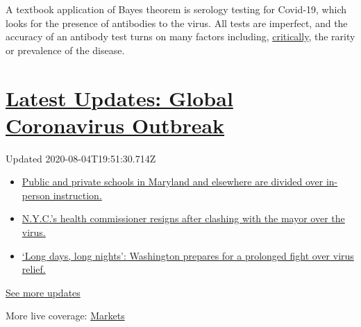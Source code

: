 A textbook application of Bayes theorem is serology testing for
Covid-19, which looks for the presence of antibodies to the virus. All
tests are imperfect, and the accuracy of an antibody test turns on many
factors including,
\href{https://www.scientificamerican.com/article/coronavirus-antibody-tests-have-a-mathematical-pitfall/}{critically},
the rarity or prevalence of the disease.

\hypertarget{latest-updates-global-coronavirus-outbreak}{%
\section{\texorpdfstring{\href{https://www.nytimes.com/2020/08/04/world/coronavirus-cases.html?action=click\&pgtype=Article\&state=default\&region=MAIN_CONTENT_1\&context=storylines_live_updates}{Latest
Updates: Global Coronavirus
Outbreak}}{Latest Updates: Global Coronavirus Outbreak}}\label{latest-updates-global-coronavirus-outbreak}}

Updated 2020-08-04T19:51:30.714Z

\begin{itemize}
\tightlist
\item
  \href{https://www.nytimes.com/2020/08/04/world/coronavirus-cases.html?action=click\&pgtype=Article\&state=default\&region=MAIN_CONTENT_1\&context=storylines_live_updates\#link-4825b93}{Public
  and private schools in Maryland and elsewhere are divided over
  in-person instruction.}
\item
  \href{https://www.nytimes.com/2020/08/04/world/coronavirus-cases.html?action=click\&pgtype=Article\&state=default\&region=MAIN_CONTENT_1\&context=storylines_live_updates\#link-4d1eafa8}{N.Y.C.'s
  health commissioner resigns after clashing with the mayor over the
  virus.}
\item
  \href{https://www.nytimes.com/2020/08/04/world/coronavirus-cases.html?action=click\&pgtype=Article\&state=default\&region=MAIN_CONTENT_1\&context=storylines_live_updates\#link-6b644638}{`Long
  days, long nights': Washington prepares for a prolonged fight over
  virus relief.}
\end{itemize}

\href{https://www.nytimes.com/2020/08/04/world/coronavirus-cases.html?action=click\&pgtype=Article\&state=default\&region=MAIN_CONTENT_1\&context=storylines_live_updates}{See
more updates}

More live coverage:
\href{https://www.nytimes.com/live/2020/08/04/business/stock-market-today-coronavirus?action=click\&pgtype=Article\&state=default\&region=MAIN_CONTENT_1\&context=storylines_live_updates}{Markets}

